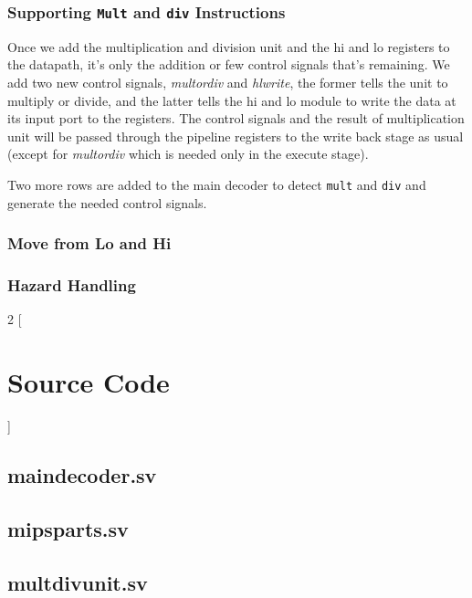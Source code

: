 \documentclass[titlepage,12pt,oneside,a4paper]{article}
\newcommand{\code}[1]{{\texttt{#1}}}
\begin{document}
\subsubsection{Supporting \code{Mult} and \code{div} Instructions}
Once we add the multiplication and division unit and the hi and lo registers to the datapath, it's only the addition or few control signals that's remaining. We add two new control signals, \textit{multordiv} and \textit{hlwrite}, the former tells the unit to multiply or divide, and the latter tells the hi and lo module to write the data at its input port to the registers. The control signals and the result of multiplication unit will be passed through the pipeline registers to the write back stage as usual (except for \textit{multordiv} which is needed only in the execute stage).

Two more rows are added to the main decoder to detect \code{mult} and \code{div} and generate the needed control signals.
\subsubsection{Move from Lo and Hi}

\subsubsection{Hazard Handling}

\newpage
\appendix
\begin{multicols}{2}
[	
\section{Source Code}
\label{appendix:src}
]
\subsection{maindecoder.sv}


\subsection{mipsparts.sv}
\label{appendix:src:mipsparts}


\subsection{multdivunit.sv}
\label{appendix:multdivunit}


\end{multicols}
\end{document}
